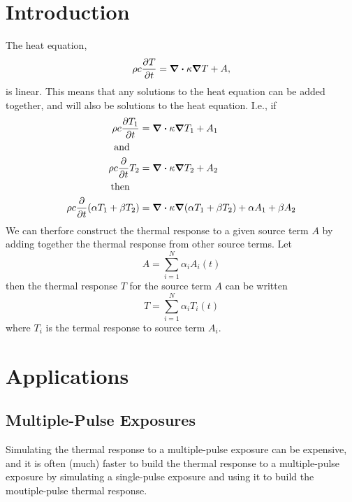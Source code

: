 \documentclass[letterpaper,10pt]{article}
\begin{document}
\section{Introduction}
\label{sec:introduction}



The heat equation,
\begin{equation}
  \rho c \pdv{T}{t} = \div{\kappa\grad{T}} + A,
\end{equation}
is linear. This means that any solutions to the heat equation can be added together, and will also
be solutions to the heat equation. I.e., if
\begin{align*}
  \rho c \pdv{T_1}{t} &= \div{\kappa\grad{T_1}} + A_1 \\
  \qand \\
  \rho c \pdv{t}T_2 &= \div{\kappa\grad{T_2}} + A_2 \\
  \qthen \\
  \rho c \pdv{t}\qty(\alpha T_1 + \beta T_2) &= \div{\kappa\grad{\qty(\alpha T_1 + \beta T_2)}} + \alpha A_1 + \beta A_2 \\
\end{align*}
We can therfore construct the thermal response to a given source term $A$ by adding together the thermal response
from other source terms. Let
\begin{equation}
  A = \sum\limits_{i=1}^N \alpha_i A_i(t)
\end{equation}
then the thermal response $T$ for the source term $A$ can be written
\begin{equation}
  T = \sum\limits_{i=1}^N \alpha_i T_i(t)
\end{equation}
where $T_i$ is the termal response to source term $A_i$.


\section{Applications}
\label{sec:applications}

\subsection{Multiple-Pulse Exposures}
\label{sub:multiple_pulse_exposures}



Simulating the thermal response to a multiple-pulse exposure can be expensive, and it is often (much) faster
to build the thermal response to a multiple-pulse exposure by simulating a single-pulse exposure and using
it to build the moutiple-pulse thermal response.
\end{document}

